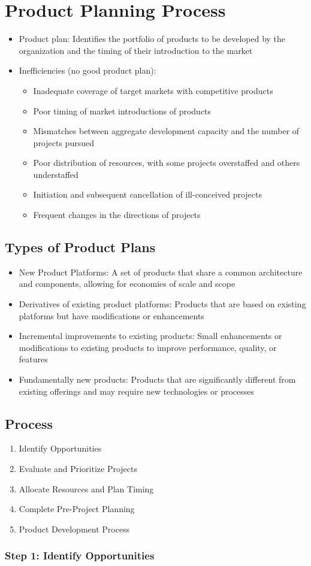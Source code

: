 \documentclass[a4paper,12pt,openany]{book}
\begin{document}
\section{Product Planning Process}
\begin{itemize}
    \item Product plan: Identifies the portfolio of products to be developed by the organization and the timing of their introduction to the market
    \item Inefficiencies (no good product plan):
    \begin{itemize}
        \item Inadequate coverage of target markets with competitive products
        \item Poor timing of market introductions of products
        \item Mismatches between aggregate development capacity and the number of projects pursued
        \item Poor distribution of resources, with some projects overstaffed and others understaffed
        \item Initiation and subsequent cancellation of ill-conceived projects
        \item Frequent changes in the directions of projects
    \end{itemize}
\end{itemize}
\subsection{Types of Product Plans}
\begin{itemize}
    \item New Product Platforms: A set of products that share a common architecture and components, allowing for economies of scale and scope
    \item Derivatives of existing product platforms: Products that are based on existing platforms but have modifications or enhancements
    \item Incremental improvements to existing products: Small enhancements or modifications to existing products to improve performance, quality, or features
    \item Fundamentally new products: Products that are significantly different from existing offerings and may require new technologies or processes
\end{itemize}
\subsection{Process}
\begin{enumerate}
    \item Identify Opportunities
    \item Evaluate and Prioritize Projects
    \item Allocate Resources and Plan Timing
    \item Complete Pre-Project Planning
    \item Product Development Process
\end{enumerate}
\subsubsection{Step 1: Identify Opportunities}
\end{document}
